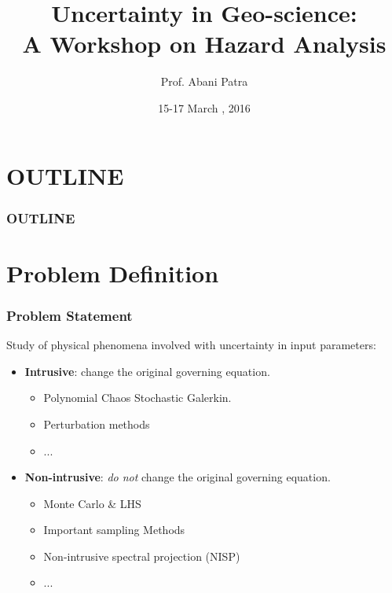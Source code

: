 \documentclass[10pt]{beamer}
\begin{document}
\title {\bfseries{\sc Uncertainty in Geo-science:\\ A Workshop on Hazard Analysis}}
\author {Prof. Abani Patra}
\date{\small 15-17 March , 2016} 
\begin{frame}
\titlepage
\end{frame}
\section*{OUTLINE}
\begin{frame}
\frametitle{OUTLINE}  
\tableofcontents
\end{frame}

\section{Problem Definition}
\begin{frame}
\frametitle{Problem Statement}
Study of physical phenomena involved with uncertainty in input parameters: 
\begin{itemize}
    \item  {\bf Intrusive}: change the original governing equation.
    \begin{itemize}
        \item Polynomial Chaos Stochastic Galerkin.
        \item Perturbation methods
        \item ...
    \end{itemize}
    \item  {\bf Non-intrusive}: \textit{ do not} change the original governing equation.
    \begin{itemize}
        \item Monte Carlo \& LHS
        \item Important sampling Methods
        \item Non-intrusive spectral projection (NISP)
        \item ...
    \end{itemize}
\end{itemize}
\end{frame}
\end{document}

